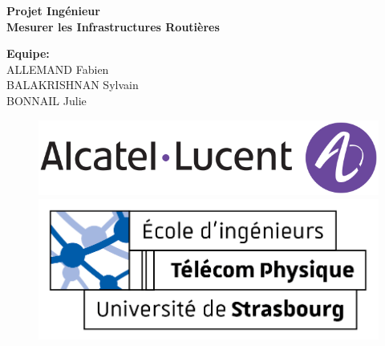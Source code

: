 \documentclass{article}
\begin{document}
\thispagestyle{empty}
\addtocounter{page}{-1}
\begin{center}
	\baselineskip=50pt
	\vspace*{1cm}
	\textbf{{\Huge Projet Ingénieur}}\\
	\vspace*{0.25cm}
	\textbf{{\Huge Mesurer les Infrastructures Routières}}\\
	\vspace*{0.25cm}
	\begin{minipage}[c]{.46\linewidth}
        \centering
        \textbf{Equipe:}\\
		ALLEMAND Fabien\\BALAKRISHNAN Sylvain\\BONNAIL Julie
    \end{minipage}
\end{center}
\vspace*{0.1cm}

\begin{figure}[H]
\centering
\centerline{\includegraphics[scale=.66]{../../common/logo_Alcatel_1.png}}
\vspace*{0.1cm}
\centerline{\includegraphics[scale=1.25]{../../common/logo_TPS_2.png}}
\end{figure}

\newpage
\renewcommand{\contentsname}{Table des matières}
\tableofcontents

\newpage
{}
\renewcommand{\listfigurename}{Liste des figures}
\listoffigures

\newpage
\vspace*{0.01cm}
\end{document}
